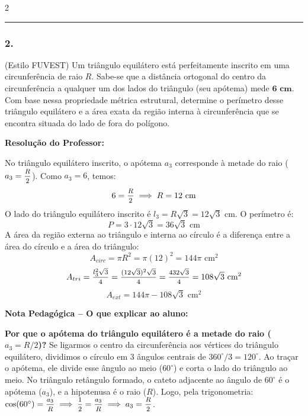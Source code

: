 \begin{multicols*}{2}
\par\vspace{\espacoQuestao}

\noindent\textcolor{CorLinha}{\rule{\linewidth}{0.5pt}} 
\par\vspace{\espacoPreQuestao}

\subsubsection*{2.} (Estilo FUVEST) Um triângulo equilátero está perfeitamente inscrito em uma circunferência de raio $R$. Sabe-se que a distância ortogonal do centro da circunferência a qualquer um dos lados do triângulo (seu apótema) mede $\mathbf{6\text{ cm}}$. Com base nessa propriedade métrica estrutural, determine o perímetro desse triângulo equilátero e a área exata da região interna à circunferência que se encontra situada do lado de fora do polígono.

\ifgabarito
    \begin{tcolorbox}[colback=CorTitUm!5, colframe=CorTitUm, boxrule=1pt, arc=4pt, left=6pt, right=6pt, top=6pt, bottom=6pt]
    \small\textbf{\textcolor{CorTitUm}{Resolução do Professor:}}\par\vspace{0.1cm}
    \color{CinzaEscuro}
    No triângulo equilátero inscrito, o apótema $a_3$ corresponde à metade do raio ($a_3 = \mfrac{R}{2}$). Como $a_3 = 6$, temos:
    \[ 6 = \mfrac{R}{2} \implies R = 12 \text{ cm} \]
    O lado do triângulo equilátero inscrito é $l_3 = R\sqrt{3} = 12\sqrt{3}$ cm. O perímetro é:
    \[ P = 3 \cdot 12\sqrt{3} = 36\sqrt{3} \text{ cm} \]
    A área da região externa ao triângulo e interna ao círculo é a diferença entre a área do círculo e a área do triângulo:
    \[ A_{circ} = \pi R^2 = \pi (12)^2 = 144\pi \text{ cm}^2 \]
    \[ A_{tri} = \mfrac{l_3^2\sqrt{3}}{4} = \mfrac{(12\sqrt{3})^2\sqrt{3}}{4} = \mfrac{432\sqrt{3}}{4} = 108\sqrt{3} \text{ cm}^2 \]
    \[ A_{ext} = 144\pi - 108\sqrt{3} \text{ cm}^2 \]
    \end{tcolorbox}
    
    \begin{boxpedagogica}
    \textbf{\textcolor{CorVerdeBorda}{Nota Pedagógica -- O que explicar ao aluno:}}\par\vspace{0.1cm}
    \color{CinzaEscuro}
    \textbf{Por que o apótema do triângulo equilátero é a metade do raio ($a_3 = R/2$)?} 
    Se ligarmos o centro da circunferência aos vértices do triângulo equilátero, dividimos o círculo em 3 ângulos centrais de $360^\circ/3 = 120^\circ$. Ao traçar o apótema, ele divide esse ângulo ao meio ($60^\circ$) e corta o lado do triângulo ao meio. No triângulo retângulo formado, o cateto adjacente ao ângulo de $60^\circ$ é o apótema ($a_3$), e a hipotenusa é o raio ($R$). Logo, pela trigonometria: $\cos(60^\circ) = \mfrac{a_3}{R} \implies \mfrac{1}{2} = \mfrac{a_3}{R} \implies a_3 = \mfrac{R}{2}$.
    \end{boxpedagogica}
\fi


\end{multicols*}
